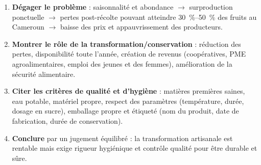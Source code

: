 \documentclass[11pt]{article}
\begin{document}
\begin{methode}
\begin{enumerate}
\item \textbf{Dégager le problème} : saisonnalité et abondance $\rightarrow$ surproduction ponctuelle $\rightarrow$ pertes post-récolte pouvant atteindre \SIrange{30}{50}{\percent} des fruits au Cameroun $\rightarrow$ baisse des prix et appauvrissement des producteurs.
\item \textbf{Montrer le rôle de la transformation/conservation} : réduction des pertes, disponibilité toute l'année, création de revenus (coopératives, PME agroalimentaires, emploi des jeunes et des femmes), amélioration de la sécurité alimentaire.
\item \textbf{Citer les critères de qualité et d'hygiène} : matières premières saines, eau potable, matériel propre, respect des paramètres (température, durée, dosage en sucre), emballage propre et étiqueté (nom du produit, date de fabrication, durée de conservation).
\item \textbf{Conclure} par un jugement équilibré : la transformation artisanale est rentable mais exige rigueur hygiénique et contrôle qualité pour être durable et sûre.
\end{enumerate}
\end{methode}
\end{document}
